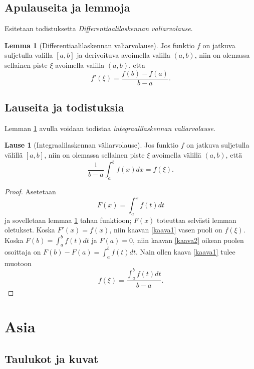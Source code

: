 \documentclass[12pt, titlepage]{article}
\theoremstyle{definition}
\newtheorem{lemma}[maar]{Lemma} %
\newtheorem{lause}[maar]{Lause}
\begin{document}
\subsection{Apulauseita ja lemmoja}
Esitetaan todistuksetta \emph{Differentiaalilaskennan valiarvolause}.
\begin{lemma}[Differentiaalilaskennan valiarvolause]
\label{diffval}
Jos funktio $f$ on jatkuva suljetulla valilla $[a,b]$ ja derivoituva avoimella valilla $(a,b)$, niin on olemassa sellainen piste $\xi$ avoimella
valilla $(a,b)$, etta
\begin{equation}
\label{kaava1}
f'(\xi)=\frac{f(b)-f(a)}{b-a}.
\end{equation}
\end{lemma}

\subsection{Lauseita ja todistuksia}
Lemman \ref{diffval} avulla voidaan todistaa \emph{integraalilaskennan valiarvolause}.
\begin{lause}[Integraalilaskennan väliarvolause]
\label{intval}
Jos funktio $f$ on jatkuva suljetulla välillä $[a,b]$, niin on olemassa sellainen piste $\xi$ avoimella välillä $(a,b)$, että
\begin{equation}\label{kaava2}
\frac{1}{b-a}\int_a^b f(x)dx=f(\xi).
\end{equation}
\end{lause}
\begin{proof}
Asetetaan
\begin{equation*}
F(x)=\int_a^x f(t)dt
\end{equation*}
ja sovelletaan lemmaa \ref{diffval} tahan funktioon; $F(x)$ toteuttaa selvästi lemman oletukset. Koska $F'(x)=f(x)$, niin kaavan \eqref{kaava1} vasen
puoli on $f(\xi)$. Koska $F(b)=\int_a^b f(t)dt$ ja $F(a)=0$, niin kaavan \eqref{kaava2} oikean puolen osoittaja on $F(b)-F(a)=\int_a^b f(t)dt$. Nain
ollen kaava \eqref{kaava1} tulee muotoon
\[%
f(\xi)=\frac{\int_a^b f(t)dt}{b-a}.
\] %
\end{proof}

\section{Asia}

\subsection{Taulukot ja kuvat}
\end{document}
